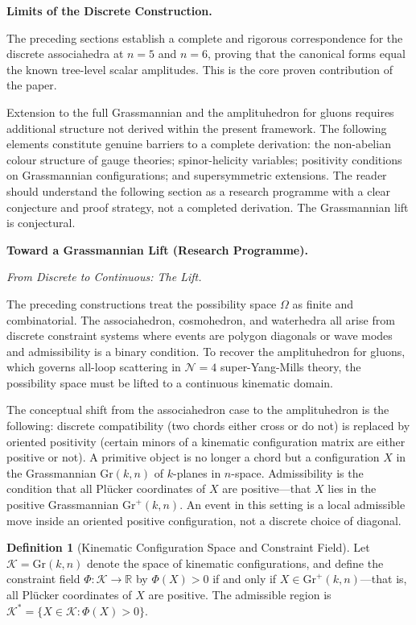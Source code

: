 \documentclass[11pt]{article}
\theoremstyle{plain}
\theoremstyle{definition}
\newtheorem{definition}[theorem]{Definition}
\theoremstyle{remark}
\newcommand{\R}{\mathbb{R}}
\newcommand{\Gr}{\mathrm{Gr}}
\newcommand{\Phif}{\Phi}
\newcommand{\OmKS}{\Omega}
\begin{document}
\bigskip\noindent\textbf{Limits of the Discrete Construction.}
\label{sec:limits}

The preceding sections establish a complete and rigorous correspondence for the discrete associahedra at $n=5$ and $n=6$, proving that the canonical forms equal the known tree-level scalar amplitudes. This is the core proven contribution of the paper.

Extension to the full Grassmannian and the amplituhedron for gluons requires additional structure not derived within the present framework. The following elements constitute genuine barriers to a complete derivation: the non-abelian colour structure of gauge theories; spinor-helicity variables; positivity conditions on Grassmannian configurations; and supersymmetric extensions. The reader should understand the following section as a research programme with a clear conjecture and proof strategy, not a completed derivation. The Grassmannian lift is conjectural.

\bigskip\noindent\textbf{Toward a Grassmannian Lift (Research Programme).}
\label{sec:amplituhedron}

\medskip\noindent\textit{From Discrete to Continuous: The Lift.}

The preceding constructions treat the possibility space $\OmKS$ as finite and combinatorial. The associahedron, cosmohedron, and waterhedra all arise from discrete constraint systems where events are polygon diagonals or wave modes and admissibility is a binary condition. To recover the amplituhedron for gluons, which governs all-loop scattering in $\mathcal{N}=4$ super-Yang-Mills theory, the possibility space must be lifted to a continuous kinematic domain.

The conceptual shift from the associahedron case to the amplituhedron is the following: discrete compatibility (two chords either cross or do not) is replaced by oriented positivity (certain minors of a kinematic configuration matrix are either positive or not). A primitive object is no longer a chord but a configuration $X$ in the Grassmannian $\Gr(k,n)$ of $k$-planes in $n$-space. Admissibility is the condition that all Pl\"ucker coordinates of $X$ are positive---that $X$ lies in the positive Grassmannian $\mathrm{Gr}^+(k,n)$. An event in this setting is a local admissible move inside an oriented positive configuration, not a discrete choice of diagonal.

\begin{definition}[Kinematic Configuration Space and Constraint Field]
Let $\mathcal{K} = \Gr(k,n)$ denote the space of kinematic configurations, and define the constraint field $\Phif: \mathcal{K} \to \R$ by $\Phif(X) > 0$ if and only if $X \in \mathrm{Gr}^+(k,n)$---that is, all Pl\"ucker coordinates of $X$ are positive. The admissible region is $\mathcal{K}^* = \{X \in \mathcal{K} : \Phif(X) > 0\}$.
\end{definition}
\end{document}
